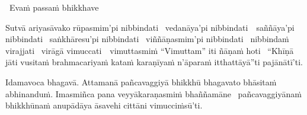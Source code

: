 \begin{pali-leader}
  \anglebracketleft\ \hspace{-0.5mm}Evaṁ passaṁ bhikkhave \hspace{-0.5mm}\anglebracketright\
\end{pali-leader}
\begin{pali-hangtogether}
  Sutvā ariyasāvako rūpasmim'pi nibbindati \breathmark\ vedanāya'pi \mbox{nibbindati}~\breathmark\ saññāya'pi nibbindati \breathmark\ saṅkhāresu'pi nibbindati \breathmark\ viññāṇasmim'pi nibbindati \breathmark\ nibbindaṁ virajjati \breathmark\ virāgā \mbox{vimuccati}~\breathmark\ vimuttasmiṁ ``Vimuttam'' iti ñāṇaṁ hoti \breathmark\ ``Khīṇā jāti vusitaṁ brahmacariyaṁ kataṁ karaṇīyaṁ n'āparaṁ itthattāyā''ti pajānātī'ti.
\end{pali-hangtogether}

\clearpage

\begin{pali-hang}
  Idamavoca bhagavā. Attamanā pañcavaggiyā bhikkhū bhagavato bhāsitaṁ abhinanduṁ. Imasmiñca pana veyyākaraṇasmiṁ bhaññamāne \breathmark\ pañcavaggiyānaṁ bhikkhūnaṁ anupādāya āsavehi cittāni vimucciṁsū'ti.
\end{pali-hang}

\suttaRef{[SN 22.59]}

